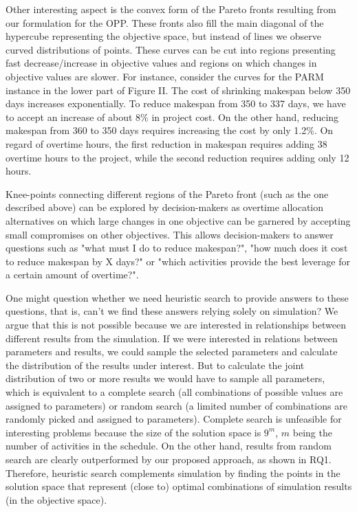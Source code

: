 \documentclass[conference]{IEEEtran}
\begin{document}
Other interesting aspect is the convex form of the Pareto fronts resulting from our formulation for the OPP. These fronts also fill the main diagonal of the hypercube representing the objective space, but instead of lines we observe curved distributions of points. These curves can be cut into regions presenting fast decrease/increase in objective values and regions on which changes in objective values are slower. For instance, consider the curves for the PARM instance in the lower part of Figure II. The cost of shrinking makespan below 350 days increases exponentially. To reduce makespan from 350 to 337 days, we have to accept an increase of about 8\% in project cost. On the other hand, reducing makespan from 360 to 350 days requires increasing the cost by only 1.2\%. On regard of overtime hours, the first reduction in makespan requires adding 38 overtime hours to the project, while the second reduction requires adding only 12 hours. 

Knee-points connecting different regions of the Pareto front (such as the one described above) can be explored by decision-makers as overtime allocation alternatives on which large changes in one objective can be garnered by accepting small compromises on other objectives. This allows decision-makers to answer questions such as "what must I do to reduce makespan?", "how much does it cost to reduce makespan by X days?" or "which activities provide the best leverage for a certain amount of overtime?".

One might question whether we need heuristic search to provide answers to these questions, that is, can't we find these answers relying solely on simulation? We argue that this is not possible because we are interested in relationships between different results from the simulation. If we were interested in relations between parameters and results, we could sample the selected parameters and calculate the distribution of the results under interest. But to calculate the joint distribution of two or more results we would have to sample all parameters, which is equivalent to a complete search (all combinations of possible values are assigned to parameters) or random search (a limited number of combinations are randomly picked and assigned to parameters). Complete search is unfeasible for interesting problems because the size of the solution space is $9^m$, $m$ being the number of activities in the schedule. On the other hand, results from random search are clearly outperformed by our proposed approach, as shown in RQ1. Therefore, heuristic search complements simulation by finding the points in the solution space that represent (close to) optimal combinations of simulation results (in the objective space).
\end{document}
